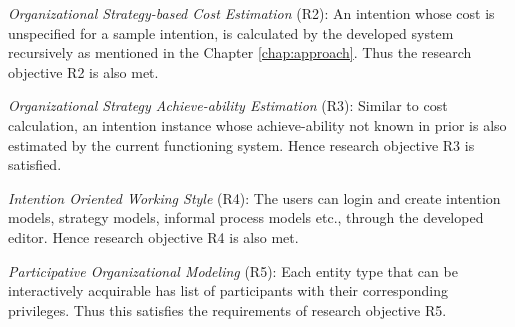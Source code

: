 \textit{Organizational Strategy-based Cost Estimation} (R2): An intention whose cost is unspecified for a sample intention, is calculated by the developed system recursively as mentioned in the Chapter \ref{chap:approach}. Thus the research objective R2 is also met.

\textit{Organizational Strategy Achieve-ability Estimation} (R3): Similar to cost calculation, an intention instance whose achieve-ability not known in prior is also estimated by the current functioning system. Hence research objective R3 is satisfied.

\textit{Intention Oriented Working Style} (R4): The users can login and create intention models, strategy models, informal process models etc., through the developed editor. Hence research objective R4 is also met.

\textit{Participative Organizational Modeling} (R5): Each entity type that can be interactively acquirable has list of participants with their corresponding privileges. Thus this satisfies the requirements of research objective R5.

